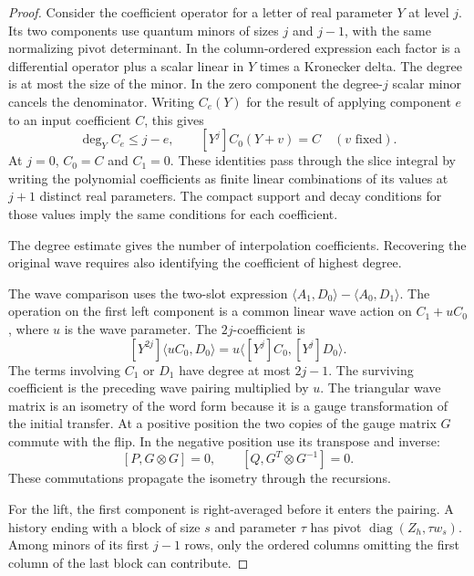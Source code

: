 \begin{proof}

Consider the coefficient operator for a letter of real
parameter \(Y\) at level \(j\). Its two components use
quantum minors of sizes \(j\) and \(j-1\), with the same
normalizing pivot determinant. In the column-ordered
expression each factor is a differential operator plus
a scalar linear in \(Y\) times a Kronecker delta.
The degree is at most the size of the minor. In the zero
component the degree-\(j\) scalar minor cancels the denominator.
Writing \(C_e(Y)\) for the result of applying component \(e\)
to an input coefficient \(C\), this gives
\[
 \deg_Y C_e\le j-e,\qquad [Y^j]C_0(Y+v)=C
                                  \quad(v\text{ fixed}).
\]
At \(j=0\), \(C_0=C\) and \(C_1=0\). These identities pass through the
slice integral by writing the polynomial coefficients as
finite linear combinations of its values at \(j+1\)
distinct real parameters. The compact support and decay
conditions for those values imply the same conditions
for each coefficient.


The degree estimate gives the number of interpolation coefficients. Recovering the original wave requires also identifying the coefficient of highest degree.


The wave comparison uses the two-slot expression
\(\langle A_1,D_0\rangle-\langle A_0,D_1\rangle\).
The operation on the first left component is a common
linear wave action on \(C_1+uC_0\), where \(u\) is the
wave parameter. The \(2j\)-coefficient is
\begin{equation}\label{eq:word-leading-wave}
 [Y^{2j}]\langle uC_0,D_0\rangle
       =u\langle [Y^j]C_0,[Y^j]D_0\rangle .
\end{equation}
The terms involving \(C_1\) or \(D_1\) have degree at most
\(2j-1\). The surviving coefficient is the preceding
wave pairing multiplied by \(u\). The triangular wave matrix
is an isometry of the word form because it is a gauge
transformation of the initial transfer. At a positive
position the two copies of the gauge matrix \(G\) commute
with the flip. In the negative position use its transpose
and inverse:
\[
  [P,G\otimes G]=0,\qquad [Q,G^T\otimes G^{-1}]=0.
\]
These commutations propagate the isometry through the recursions.


For the lift, the first component is right-averaged before
it enters the pairing. A history ending with a block of
size \(s\) and parameter \(\tau\) has pivot
\(\operatorname{diag}(Z_h,\tau w_s)\). Among minors of
its first \(j-1\) rows, only the ordered columns omitting
the first column of the last block can contribute.


\end{proof}
